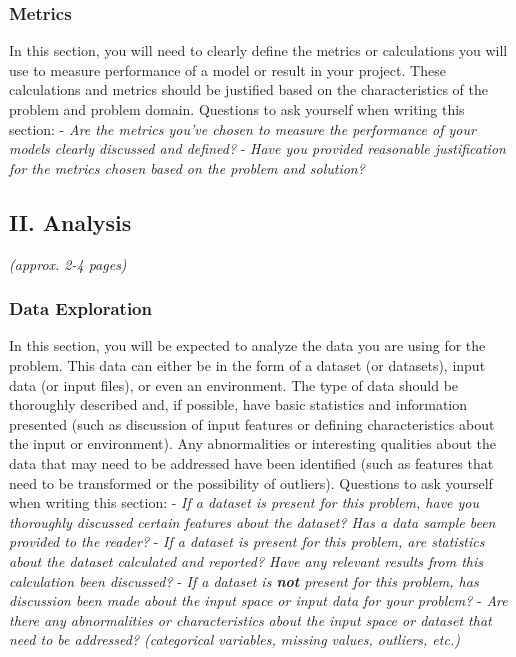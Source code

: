 \documentclass[]{article}
\begin{document}
\subsubsection{Metrics}\label{metrics}

In this section, you will need to clearly define the metrics or
calculations you will use to measure performance of a model or result in
your project. These calculations and metrics should be justified based
on the characteristics of the problem and problem domain. Questions to
ask yourself when writing this section: - \emph{Are the metrics you've
chosen to measure the performance of your models clearly discussed and
defined?} - \emph{Have you provided reasonable justification for the
metrics chosen based on the problem and solution?}

\subsection{II. Analysis}\label{ii.-analysis}

\emph{(approx. 2-4 pages)}

\subsubsection{Data Exploration}\label{data-exploration}

In this section, you will be expected to analyze the data you are using for the problem. This data can either be in the form of a dataset (or datasets), input data (or input files), or even an environment. The type
of data should be thoroughly described and, if possible, have basic
statistics and information presented (such as discussion of input
features or defining characteristics about the input or environment).
Any abnormalities or interesting qualities about the data that may need
to be addressed have been identified (such as features that need to be
transformed or the possibility of outliers). Questions to ask yourself
when writing this section: - \emph{If a dataset is present for this
problem, have you thoroughly discussed certain features about the
dataset? Has a data sample been provided to the reader?} - \emph{If a
dataset is present for this problem, are statistics about the dataset
calculated and reported? Have any relevant results from this calculation
been discussed?} - \emph{If a dataset is \textbf{not} present for this
problem, has discussion been made about the input space or input data
for your problem?} - \emph{Are there any abnormalities or
characteristics about the input space or dataset that need to be
addressed? (categorical variables, missing values, outliers, etc.)}
\end{document}
